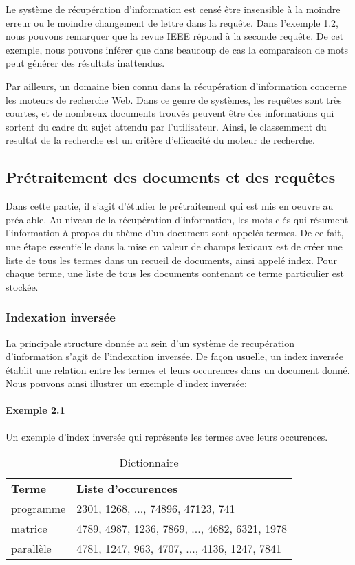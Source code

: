 Le système de récupération d'information est censé être
insensible à la moindre erreur ou le moindre changement
de lettre dans la requête.
Dans l'exemple 1.2, nous pouvons remarquer que la revue IEEE
répond à la seconde requête.
De cet exemple, nous pouvons inférer que dans beaucoup de cas
la comparaison de mots peut générer des résultats inattendus.

Par ailleurs, un domaine bien connu dans la récupération
d'information concerne les moteurs de recherche Web.
Dans ce genre de systèmes, les requêtes sont très courtes,
et de nombreux documents trouvés peuvent être des informations
qui sortent du cadre du sujet attendu par l'utilisateur.
Ainsi, le classemment du resultat de la recherche est un
critère d'efficacité du moteur de recherche.

\subsection{Prétraitement des documents et des requêtes}

Dans cette partie, il s'agit d'étudier le prétraitement qui
est mis en oeuvre au préalable.
Au niveau de la récupération d'information,
les mots clés qui résument l'information à propos du thème
d'un document sont appelés termes.
De ce fait, une étape essentielle dans la mise en valeur
de champs lexicaux est de créer une liste de tous les termes
dans un recueil de documents, ainsi appelé index.
Pour chaque terme, une liste de tous les documents contenant
ce terme particulier est stockée.

\subsubsection{Indexation inversée}

La principale structure donnée au sein d'un système
de recupération d'information s'agit de l'indexation
inversée. De façon usuelle, un index inversée établit
une relation entre les termes et leurs occurences dans un
document donné. Nous pouvons ainsi illustrer un exemple
d'index inversée:

\paragraph{Exemple 2.1}
Un exemple d'index inversée qui représente les termes
avec leurs occurences.

\begin{table}[h]
\begin{center}
\begin{tabular}{l l}
\bf Terme & \bf Liste d'occurences \\
programme & 2301, 1268, ..., 74896, 47123, 741 \\
matrice   & 4789, 4987, 1236, 7869, ..., 4682, 6321, 1978 \\
parallèle & 4781, 1247, 963, 4707, ..., 4136, 1247, 7841
\end{tabular}
\caption{Dictionnaire}
\end{center}
\end{table}

